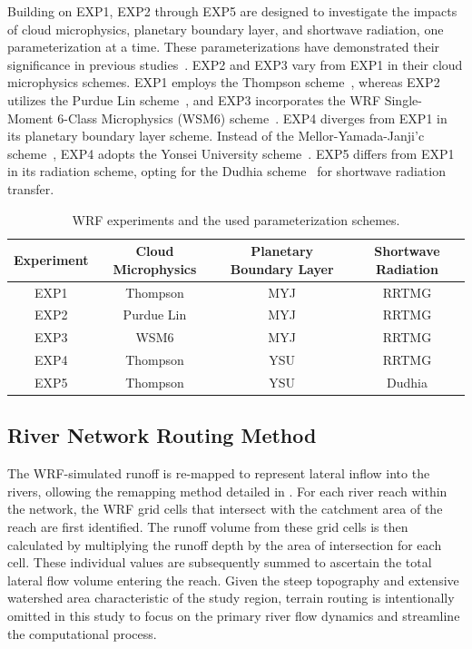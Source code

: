 \documentclass[draft]{agujournal2019}
\begin{document}
Building on EXP1, EXP2 through EXP5 are designed to investigate the impacts of cloud microphysics, planetary boundary layer, and shortwave radiation, one parameterization at a time. These parameterizations have demonstrated their significance in previous studies~\cite{lv2020JGRA, prein2023CD}. EXP2 and EXP3 vary from EXP1 in their cloud microphysics schemes. EXP1 employs the Thompson scheme~\cite{thompson2008MWR}, whereas EXP2 utilizes the Purdue Lin scheme~\cite{chen2002JMSJ}, and EXP3 incorporates the WRF Single-Moment 6-Class Microphysics (WSM6) scheme~\cite{hong2006APJAS}. EXP4 diverges from EXP1 in its planetary boundary layer scheme. Instead of the Mellor-Yamada-Janji'c scheme~\cite{janjic1994MWR}, EXP4 adopts the Yonsei University scheme~\cite{hong2006MWR}. EXP5 differs from EXP1 in its radiation scheme, opting for the Dudhia scheme~\cite{dudhia1989JAS} for shortwave radiation transfer.

\begin{table}[h!]
  \doublerulesep 0.3pt
  \renewcommand{\arraystretch}{1}  %
  \caption{WRF experiments and the used parameterization schemes.}
  \label{tab:wrf_experiment}
  \vspace*{5mm}
  \begin{tabular*}{140mm}{cccc}
    \hline
    Experiment & Cloud Microphysics & Planetary Boundary Layer & Shortwave Radiation \\
    \hline
    EXP1 & Thompson & MYJ & RRTMG \\
    EXP2 & Purdue Lin & MYJ & RRTMG \\
    EXP3 & WSM6 & MYJ & RRTMG \\
    EXP4 & Thompson & YSU & RRTMG \\
    EXP5 & Thompson & YSU & Dudhia \\
    \hline
  \end{tabular*}
  \renewcommand{\arraystretch}{1}  %
\end{table}


\subsection{River Network Routing Method}
\label{sec:river}

The WRF-simulated runoff is re-mapped to represent lateral inflow into the rivers, ollowing the remapping method detailed in \cite{lin2018EMS, wang2019CSB}. For each river reach within the network, the WRF grid cells that intersect with the catchment area of the reach are first identified. The runoff volume from these grid cells is then calculated by multiplying the runoff depth by the area of intersection for each cell. These individual values are subsequently summed to ascertain the total lateral flow volume entering the reach. Given the steep topography and extensive watershed area characteristic of the study region, terrain routing is intentionally omitted in this study to focus on the primary river flow dynamics and streamline the computational process.
\end{document}

